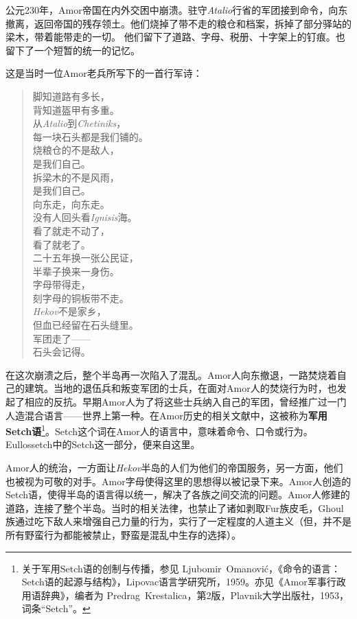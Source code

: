 公元230年，Amor帝国在内外交困中崩溃。驻守\textit{Atalio}行省的军团接到命令，向东撤离，返回帝国的残存领土。他们烧掉了带不走的粮仓和档案，拆掉了部分驿站的梁木，带着能带走的一切。
他们留下了道路、字母、税册、十字架上的钉痕。也留下了一个短暂的统一的记忆。

这是当时一位Amor老兵所写下的一首行军诗：

{\small\kaishu
\begin{verse}
脚知道路有多长， \\
背知道盔甲有多重。 \\
从\textit{Atalio}到\textit{Chetiniks}， \\
每一块石头都是我们铺的。 \\[4pt]

烧粮仓的不是敌人， \\
是我们自己。 \\
拆梁木的不是风雨， \\
是我们自己。 \\[4pt]

向东走，向东走。 \\
没有人回头看\textit{Ignisis}海。 \\
看了就走不动了， \\
看了就老了。 \\[4pt]

二十五年换一张公民证， \\
半辈子换来一身伤。 \\
字母带得走， \\
刻字母的铜板带不走。 \\[4pt]

\textit{Hekov}不是家乡， \\
但血已经留在石头缝里。 \\
军团走了—— \\
石头会记得。
\end{verse}}

在这次崩溃之后，整个半岛再一次陷入了混乱。Amor人向东撤退，一路焚烧着自己的建筑。当地的退伍兵和叛变军团的士兵，在面对Amor人的焚烧行为时，也发起了相应的反抗。早期Amor人为了将这些士兵纳入自己的军团，曾经推广过一门人造混合语言——世界上第一种。在Amor历史的相关文献中，这被称为\textbf{军用Setch语}\footnote{关于军用Setch语的创制与传播，参见 Ljubomir~Omanović，《命令的语言：Setch语的起源与结构》，Lipovac语言学研究所，1959。亦见《Amor军事行政用语辞典》，编者为 Predrag~Krestalica，第2版，Plavnik大学出版社，1953，词条``Setch''。}。Setch这个词在Amor人的语言中，意味着命令、口令或行为。Eullossetch中的Setch这一部分，便来自这里。

Amor人的统治，一方面让\textit{Hekov}半岛的人们为他们的帝国服务，另一方面，他们也被视为可敬的对手。Amor字母使得这里的思想得以被记录下来。Amor人创造的Setch语，使得半岛的语言得以统一，解决了各族之间交流的问题。Amor人修建的道路，连接了整个半岛。当时的相关法律，也禁止了诸如剥取Fur族皮毛，Ghoul族通过吃下敌人来增强自己力量的行为，实行了一定程度的人道主义（但，并不是所有野蛮行为都能被禁止，野蛮是混乱中生存的选择）。

